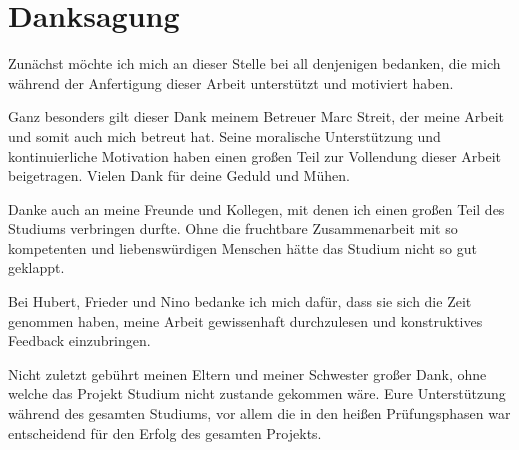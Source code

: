 \section*{Danksagung}
\vspace{0.5cm}

Zunächst möchte ich mich an dieser Stelle bei all denjenigen bedanken, die mich während der Anfertigung dieser Arbeit unterstützt und motiviert haben.

Ganz besonders gilt dieser Dank meinem Betreuer Marc Streit, der meine Arbeit und somit auch mich betreut hat. Seine moralische Unterstützung und kontinuierliche Motivation haben einen großen Teil zur Vollendung dieser Arbeit beigetragen. Vielen Dank für deine Geduld und Mühen.

Danke auch an meine Freunde und Kollegen, mit denen ich einen großen Teil des Studiums verbringen durfte. Ohne die fruchtbare Zusammenarbeit mit so kompetenten und liebenswürdigen Menschen hätte das Studium nicht so gut geklappt.

Bei Hubert, Frieder und Nino bedanke ich mich dafür, dass sie sich die Zeit genommen haben, meine Arbeit gewissenhaft durchzulesen und konstruktives Feedback einzubringen.

Nicht zuletzt gebührt meinen Eltern und meiner Schwester großer Dank, ohne welche das Projekt Studium nicht zustande gekommen wäre. Eure Unterstützung während des gesamten Studiums, vor allem die in den heißen Prüfungsphasen war entscheidend für den Erfolg des gesamten Projekts.
